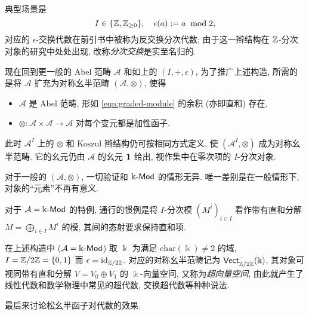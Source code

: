 \begin{example}[分次模与分次代数]
	典型场景是
	\[ I \in \{\mathbb{Z}, \mathbb{Z}_{\geq 0} \}, \quad \epsilon(a) := a \;\bmod 2 , \]
	对应的 $\epsilon$-交换代数在前引书中被称为反交换分次代数; 由于这一辫结构在 $\mathbb{Z}$-分次对象的研究中处处出现, 改称\emph{分次交换}是实至名归的.
	
	现在回到更一般的 Abel 范畴 $\mathcal{A}$ 和如上的 $(I, +, \epsilon)$, 为了推广上述构造, 所需的是将 $\mathcal{A}$ 扩充为对称幺半范畴 $(\mathcal{A}, \otimes)$, 使得
	\begin{itemize}
		\item $\mathcal{A}$ 是 Abel 范畴, 形如 \eqref{eqn:graded-module} 的余积 (亦即直和) 存在,
		\item $\otimes: \mathcal{A} \times \mathcal{A} \to \mathcal{A}$ 对每个变元都是加性函子.
	\end{itemize}
	此时 $\mathcal{A}^I$ 上的 $\otimes$ 和 Koszul 辫结构仍可按相同方式定义, 使 $(\mathcal{A}^I, \otimes)$ 成为对称幺半范畴. 它的幺元仍由 $\mathcal{A}$ 的幺元 $\bm{1}$ 给出, 视作集中在零次项的 $I$-分次对象.
	
	对于一般的 $(\mathcal{A}, \otimes)$, 一切验证和 $\Bbbk\text{-}\mathsf{Mod}$ 的情形无异. 唯一差别是在一般情形下, 对象的``元素''不再有意义. 
\end{example}

\begin{convention}
	对于 $\mathcal{A} = \Bbbk\text{-}\mathsf{Mod}$ 的特例, 通行的惯例是将 $I$-分次模 $(M^i)_{i \in I}$ 看作带有直和分解 $M = \bigoplus_{i \in I} M^i$ 的模, 其间的态射要求保持直和项.
\end{convention}

\begin{example}\label{eg:superspace}
	在上述构造中 ($\mathcal{A} = \Bbbk\text{-}\mathsf{Mod}$) 取 $\Bbbk$ 为满足 $\mathrm{char}(\Bbbk) \neq 2$ 的域, $I = \mathbb{Z}/2\mathbb{Z} = \{0, 1\}$ 而 $\epsilon = \mathrm{id}_{\mathbb{Z}/2\mathbb{Z}}$. 对应的对称幺半范畴记为 $\mathsf{Vect}^-_{\mathbb{Z}/2\mathbb{Z}}(\Bbbk)$, 其对象可视同带有直和分解 $V = V_0 \oplus V_1$ 的 $\Bbbk$-向量空间, 又称为\emph{超向量空间}, 由此就产生了线性代数和数学物理中常见的超代数, 交换超代数等种种说法.
\end{example}

最后来讨论松幺半函子对代数的效果.

